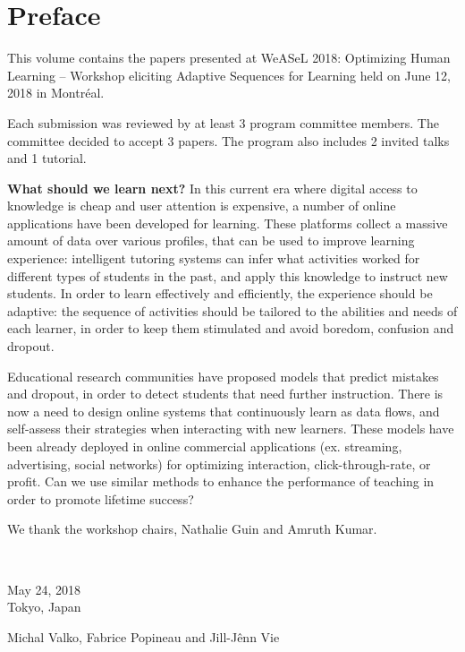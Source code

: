 \documentclass[procedia]{easychair}
\begin{document}
\section*{Preface}
This volume contains the papers presented at WeASeL 2018: Optimizing Human Learning -- Workshop eliciting Adaptive Sequences for Learning held on June 12, 2018 in Montr\'eal.



Each submission was reviewed by at least 3 program committee members. The committee decided to accept 3 papers. The program also includes 2 invited talks and 1 tutorial.



\textbf{What should we learn next?} In this current era where digital access to knowledge is cheap and user attention is expensive, a number of online applications have been developed for learning. These platforms collect a massive amount of data over various profiles, that can be used to improve learning experience: intelligent tutoring systems can infer what activities worked for different types of students in the past, and apply this knowledge to instruct new students. In order to learn effectively and efficiently, the experience should be adaptive: the sequence of activities should be tailored to the abilities and needs of each learner, in order to keep them stimulated and avoid boredom, confusion and dropout.



Educational research communities have proposed models that predict mistakes and dropout, in order to detect students that need further instruction. There is now a need to design online systems that continuously learn as data flows, and self-assess their strategies when interacting with new learners. These models have been already deployed in online commercial applications (ex. streaming, advertising, social networks) for optimizing interaction, click-through-rate, or profit. Can we use similar methods to enhance the performance of teaching in order to promote lifetime success?



We thank the workshop chairs, Nathalie Guin and Amruth Kumar.



~\bigskip


\noindent
\begin{minipage}[t]{.4\textwidth}
May 24, 2018\\
Tokyo, Japan
\end{minipage}%
\hfill
\begin{minipage}[t]{.4\textwidth}\flushright
Michal Valko, Fabrice Popineau and Jill-J\^enn Vie
\end{minipage}
\end{document}
